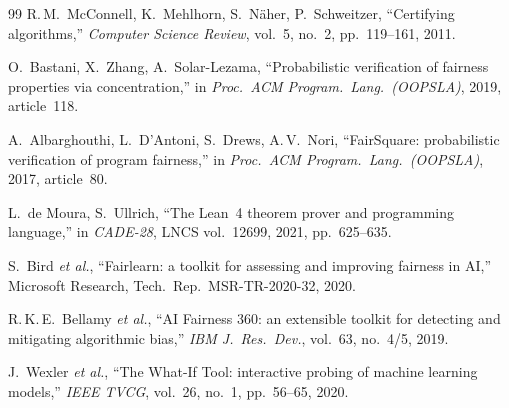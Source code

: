 \documentclass{ceurart}
\begin{document}
\begin{thebibliography}{99}
R.\,M.\ McConnell, K.\ Mehlhorn, S.\ N\"aher, P.\ Schweitzer,
``Certifying algorithms,''
\emph{Computer Science Review}, vol.~5, no.~2, pp.~119--161, 2011.

O.\ Bastani, X.\ Zhang, A.\ Solar-Lezama,
``Probabilistic verification of fairness properties via concentration,''
in \emph{Proc.\ ACM Program.\ Lang.\ (OOPSLA)}, 2019,
article~118.

A.\ Albarghouthi, L.\ D'Antoni, S.\ Drews, A.\,V.\ Nori,
``FairSquare: probabilistic verification of program fairness,''
in \emph{Proc.\ ACM Program.\ Lang.\ (OOPSLA)}, 2017,
article~80.

L.\ de Moura, S.\ Ullrich,
``The Lean~4 theorem prover and programming language,''
in \emph{CADE-28}, LNCS vol.~12699, 2021, pp.~625--635.

S.\ Bird \emph{et al.},
``Fairlearn: a toolkit for assessing and improving fairness in AI,''
Microsoft Research, Tech.\ Rep.\ MSR-TR-2020-32, 2020.

R.\,K.\,E.\ Bellamy \emph{et al.},
``AI Fairness 360: an extensible toolkit for detecting and mitigating
algorithmic bias,''
\emph{IBM J.\ Res.\ Dev.}, vol.~63, no.~4/5, 2019.

J.\ Wexler \emph{et al.},
``The What-If Tool: interactive probing of machine learning models,''
\emph{IEEE TVCG}, vol.~26, no.~1, pp.~56--65, 2020.

\end{thebibliography}
\end{document}
